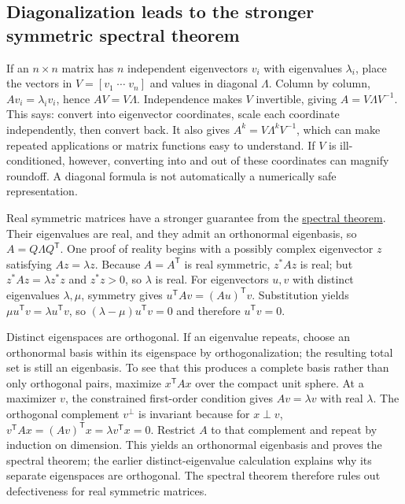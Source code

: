 \subsection{Diagonalization leads to the stronger symmetric spectral theorem}\label{01-foundations-i-ch020-diagonalization-leads-to-the-stronger-symmetric-spectral-theorem}

If an \(n\times n\) matrix has \(n\) independent eigenvectors \(v_i\) with eigenvalues \(\lambda_i\), place the vectors in \(V=[v_1\;\cdots\;v_n]\) and values in diagonal \(\Lambda\). Column by column, \(Av_i=\lambda_i v_i\), hence \(AV=V\Lambda\). Independence makes \(V\) invertible, giving \(A=V\Lambda V^{-1}\). This says: convert into eigenvector coordinates, scale each coordinate independently, then convert back. It also gives \(A^k=V\Lambda^kV^{-1}\), which can make repeated applications or matrix functions easy to understand. If \(V\) is ill-conditioned, however, converting into and out of these coordinates can magnify roundoff. A diagonal formula is not automatically a numerically safe representation.

Real symmetric matrices have a stronger guarantee from the \hyperref[01-foundations-i-ch020-eigenvalues-eigenspaces-and-the-two-kinds-of-multiplicity]{spectral theorem}. Their eigenvalues are real, and they admit an orthonormal eigenbasis, so \(A=Q\Lambda Q^\mathsf T\). One proof of reality begins with a possibly complex eigenvector \(z\) satisfying \(Az=\lambda z\). Because \(A=A^\mathsf T\) is real symmetric, \(z^*Az\) is real; but \(z^*Az=\lambda z^*z\) and \(z^*z>0\), so \(\lambda\) is real. For eigenvectors \(u,v\) with distinct eigenvalues \(\lambda,\mu\), symmetry gives \(u^\mathsf TAv=(Au)^\mathsf Tv\). Substitution yields \(\mu u^\mathsf Tv=\lambda u^\mathsf Tv\), so \((\lambda-\mu)u^\mathsf Tv=0\) and therefore \(u^\mathsf Tv=0\).

Distinct eigenspaces are orthogonal. If an eigenvalue repeats, choose an orthonormal basis within its eigenspace by orthogonalization; the resulting total set is still an eigenbasis. To see that this produces a complete basis rather than only orthogonal pairs, maximize \(x^\mathsf TAx\) over the compact unit sphere. At a maximizer \(v\), the constrained first-order condition gives \(Av=\lambda v\) with real \(\lambda\). The orthogonal complement \(v^\perp\) is invariant because for \(x\perp v\), \(v^\mathsf TAx=(Av)^\mathsf Tx=\lambda v^\mathsf Tx=0\). Restrict \(A\) to that complement and repeat by induction on dimension. This yields an orthonormal eigenbasis and proves the spectral theorem; the earlier distinct-eigenvalue calculation explains why its separate eigenspaces are orthogonal. The spectral theorem therefore rules out defectiveness for real symmetric matrices.

